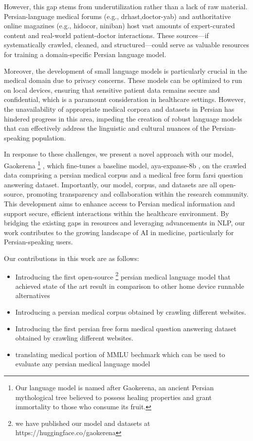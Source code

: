 \documentclass[conference]{IEEEtran}
\begin{document}
However, this gap stems from underutilization rather than a lack of raw material. Persian-language medical forums (e.g., drhast,doctor-yab) and authoritative online magazines (e.g., hidocor, niniban) host vast amounts of expert-curated content and real-world patient-doctor interactions. These sources—if systematically crawled, cleaned, and structured—could serve as valuable resources for training a domain-specific Persian language model.

Moreover, the development of small language models is particularly crucial in the medical domain due to privacy concerns. These models can be optimized to run on local devices, ensuring that sensitive patient data remains secure and confidential, which is a paramount consideration in healthcare settings. However, the unavailability of appropriate medical corpora and datasets in Persian has hindered progress in this area, impeding the creation of robust language models that can effectively address the linguistic and cultural nuances of the Persian-speaking population.

In response to these challenges, we present a novel approach with our model, Gaokerena
\footnote{
Our language model is named after Gaokerena, an ancient Persian mythological tree believed to possess healing properties and grant immortality to those who consume its fruit.
}
, which fine-tunes a baseline model, aya-expanse-8b
\cite{b5}
, on the crawled data comprising a persian medical corpus and a medical free form farsi question answering dataset. Importantly, our model, corpus, and datasets are all open-source, promoting transparency and collaboration within the research community. This development aims to enhance access to Persian medical information and support secure, efficient interactions within the healthcare environment. By bridging the existing gaps in resources and leveraging advancements in NLP, our work contributes to the growing landscape of AI in medicine, particularly for Persian-speaking users.

Our contributions in this work are as follows:
\begin{itemize}
	\item Introducing the first open-source
	\footnote{
	we have published our model and datasets at https://huggingface.co/gaokerena
	}
	persian medical language model that achieved state of the art result in
	comparison to other home device runnable alternatives
	\item Introducing a persian medical corpus obtained by crawling different websites.
	\item  Introducing the first persian free form medical question answering dataset obtained by crawling different websites.
	\item translating medical portion of MMLU bechmark which can be used to evaluate any persian medical language model
\end{itemize}
\end{document}
